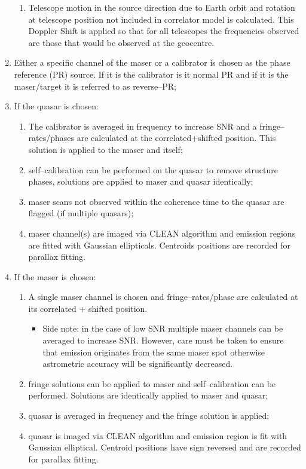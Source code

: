 \begin{enumerate}
\begin{enumerate}
			\item Telescope motion in the source direction due to Earth orbit and rotation at telescope position not included in correlator model is calculated. This Doppler Shift is applied so that for all telescopes the frequencies observed are those that would be observed at the geocentre.
		\end{enumerate}
		\item Either a specific channel of the maser or a calibrator is chosen as the phase reference (PR) source. If it is the calibrator is it normal PR and if it is the maser/target it is referred to as reverse--PR;
		\item If the quasar is chosen: \begin{enumerate}
			\item The calibrator is averaged in frequency to increase SNR and a fringe--rates/phases are calculated at the correlated+shifted position. This solution is applied to the maser and itself;
			\item self--calibration can be performed on the quasar to remove structure phases, solutions are applied to maser and quasar identically;
			\item maser scans not observed within the coherence time to the quasar are flagged (if multiple quasars);
			\item maser channel(s) are imaged via CLEAN algorithm and emission regions are fitted with Gaussian ellipticals. Centroids positions are recorded for parallax fitting.
		\end{enumerate}
		\item If the maser is chosen: \begin{enumerate}
				\item A single maser channel is chosen and fringe--rates/phase are calculated at its correlated + shifted position.
				\begin{itemize}
					\item Side note: in the case of low SNR multiple maser channels can be averaged to increase SNR. However, care must be taken to ensure that emission originates from the same maser spot otherwise astrometric accuracy will be significantly decreased.
				\end{itemize}
      			\item fringe solutions can be applied to maser and self--calibration can be performed. Solutions are identically applied to maser and quasar;
				\item quasar is averaged in frequency and the fringe solution is applied;
				\item quasar is imaged via CLEAN algorithm and emission region is fit with Gaussian elliptical. Centroid positions have sign reversed and are recorded for parallax fitting.
			\end{enumerate}
		\end{enumerate}

 









